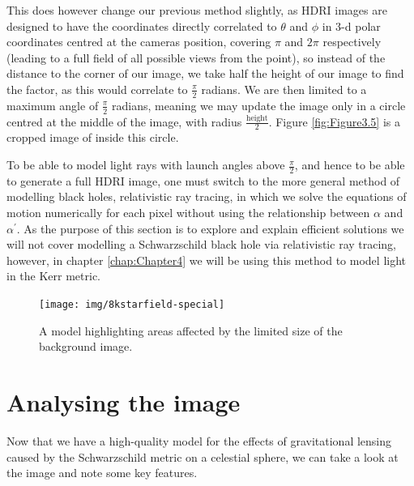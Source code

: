 \documentclass[oneside,openright,frontopenright, singlespacing]{dmathesis}
\begin{document}
\vspace{1em}
	This does however change our previous method slightly, as HDRI images are designed to have the coordinates directly correlated to $\theta$ and $\phi$ in 3-d polar coordinates centred at the cameras position, covering $\pi$ and $2\pi$ respectively (leading to a full field of all possible views from the point), so instead of the distance to the corner of our image, we take half the height of our image to find the factor, as this would correlate to $\frac{\pi}{2}$ radians. We are then limited to a maximum angle of $\frac{\pi}{2}$ radians, meaning we may update the image only in a circle centred at the middle of the image, with radius $\frac{\mbox{height}}{2}$. Figure \ref{fig:Figure3.5} is a cropped image of inside this circle.

\vspace{1em}
	To be able to model light rays with launch angles above $\frac{\pi}{2}$, and hence to be able to generate a full HDRI image, one must switch to the more general method of modelling black holes, relativistic ray tracing, in which we solve the equations of motion numerically for each pixel without using the relationship between $\alpha$ and $\alpha^'$. As the purpose of this section is to explore and explain efficient solutions we will not cover modelling a Schwarzschild black hole via relativistic ray tracing, however, in chapter \ref{chap:Chapter4} we will be using this method to model light in the Kerr metric.

\begin{figure}[!ht]
	\centering
	\texttt{[image: img/8kstarfield-special]}
	\caption{A model highlighting areas affected by the limited size of the background image.}
	\label{fig:Figure3.4}
\end{figure}

\section{Analysing the image}\label{sec:Section3.6}

	Now that we have a high-quality model for the effects of gravitational lensing caused by the Schwarzschild metric on a celestial sphere, we can take a look at the image and note some key features.
\end{document}
